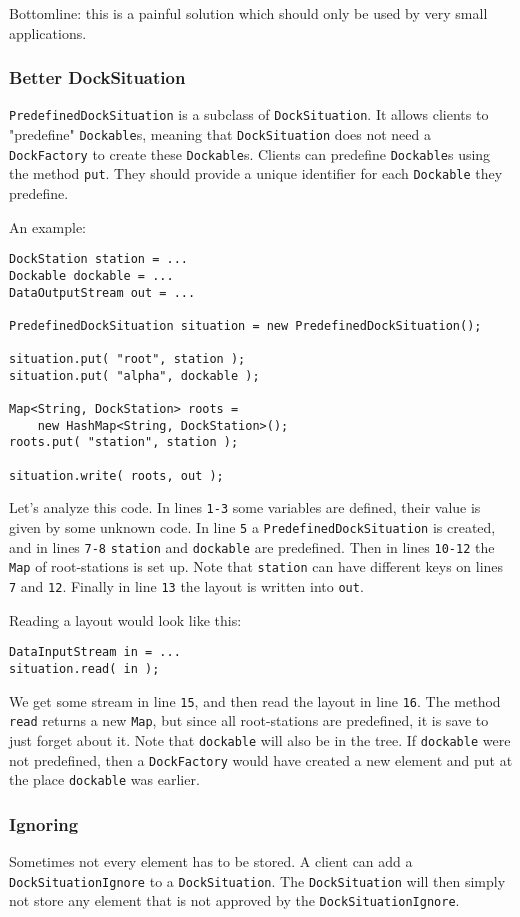 \documentclass[a4paper,10pt]{article}
\newcommand{\src}[1]{\lstinline[basicstyle=\ttfamily]|#1|}
\begin{document}
Bottomline: this is a painful solution which should only be used by very small applications.

\subsubsection{Better DockSituation}
\src{PredefinedDockSituation} is a subclass of \src{DockSituation}. It allows clients to "predefine" \src{Dockable}s, meaning that \src{DockSituation} does not need a \src{DockFactory} to create these \src{Dockable}s. Clients can predefine \src{Dockable}s using the method \src{put}. They should provide a unique identifier for each \src{Dockable} they predefine.

An example:
\begin{lstlisting}
DockStation station = ...
Dockable dockable = ...
DataOutputStream out = ...

PredefinedDockSituation situation = new PredefinedDockSituation();

situation.put( "root", station );
situation.put( "alpha", dockable );

Map<String, DockStation> roots = 
	new HashMap<String, DockStation>();
roots.put( "station", station );

situation.write( roots, out );
\end{lstlisting}
Let's analyze this code. In lines \src{1-3} some variables are defined, their value is given by some unknown code. In line \src{5} a \src{PredefinedDockSituation} is created, and in lines \src{7-8} \src{station} and \src{dockable} are predefined. Then in lines \src{10-12} the \src{Map} of root-stations is set up. Note that \src{station} can have different keys on lines \src{7} and \src{12}. Finally in line \src{13} the layout is written into \src{out}.

Reading a layout would look like this:
\begin{lstlisting}[firstnumber=15]
DataInputStream in = ...
situation.read( in );
\end{lstlisting}
We get some stream in line \src{15}, and then read the layout in line \src{16}. The method \src{read} returns a new \src{Map}, but since all root-stations are predefined, it is save to just forget about it. Note that \src{dockable} will also be in the tree. If \src{dockable} were not predefined, then a \src{DockFactory} would have created a new element and put at the place \src{dockable} was earlier.

\subsubsection{Ignoring}
Sometimes not every element has to be stored. A client can add a \src{DockSituationIgnore} to a \src{DockSituation}. The \src{DockSituation} will then simply not store any element that is not approved by the \src{DockSituationIgnore}.
\end{document}
